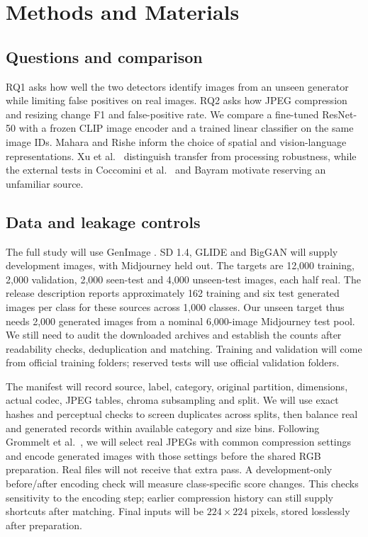 \section{Methods and Materials}
\label{sec:methods}
\subsection{Questions and comparison}
RQ1 asks how well the two detectors identify images from an unseen generator while limiting false positives on real images. RQ2 asks how JPEG compression and resizing change F1 and false-positive rate. We compare a fine-tuned ResNet-50 with a frozen CLIP image encoder and a trained linear classifier on the same image IDs. Mahara and Rishe \citep{mahara2026} inform the choice of spatial and vision-language representations. Xu et al.\ \citep{xu2026} distinguish transfer from processing robustness, while the external tests in Coccomini et al.\ \citep{coccomini2024} and Bayram \citep{bayram2026} motivate reserving an unfamiliar source.

\subsection{Data and leakage controls}
The full study will use GenImage \citep{genimage2023}. SD 1.4, GLIDE and BigGAN will supply development images, with Midjourney held out. The targets are 12,000 training, 2,000 validation, 2,000 seen-test and 4,000 unseen-test images, each half real. The release description reports approximately 162 training and six test generated images per class for these sources across 1,000 classes. Our unseen target thus needs 2,000 generated images from a nominal 6,000-image Midjourney test pool. We still need to audit the downloaded archives and establish the counts after readability checks, deduplication and matching. Training and validation will come from official training folders; reserved tests will use official validation folders.

The manifest will record source, label, category, original partition, dimensions, actual codec, JPEG tables, chroma subsampling and split. We will use exact hashes and perceptual checks to screen duplicates across splits, then balance real and generated records within available category and size bins. Following Grommelt et al.\ \citep{grommelt2025}, we will select real JPEGs with common compression settings and encode generated images with those settings before the shared RGB preparation. Real files will not receive that extra pass. A development-only before/after encoding check will measure class-specific score changes. This checks sensitivity to the encoding step; earlier compression history can still supply shortcuts after matching. Final inputs will be $224\times224$ pixels, stored losslessly after preparation.

